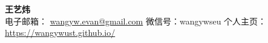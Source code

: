 \begin{center}
    {\Large \textbf{王艺炜}}\\
    电子邮箱： \href{mailto:wangyw.evan@gmail.com}{wangyw.evan@gmail.com} \quad 微信号：wangywseu \quad 个人主页： \href{https://wangywust.github.io/}{https://wangywust.github.io/}
\end{center}
